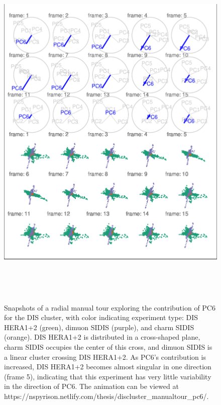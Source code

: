 \begin{Schunk}
\begin{figure}

{\centering \includegraphics[width=5.83in,height=7in]{spinifex_paper_files/figure-latex/DISclusterGood-1} 

}

\caption[Snapshots of a radial manual tour exploring the contribution of PC6 for the DIS cluster, with color indicating experiment type]{Snapshots of a radial manual tour exploring the contribution of PC6 for the DIS cluster, with color indicating experiment type: DIS HERA1+2 (green), dimuon SIDIS (purple), and charm SIDIS (orange). DIS HERA1+2 is distributed in a cross-shaped plane, charm SIDIS occupies the center of this cross, and dimuon SIDIS is a linear cluster crossing DIS HERA1+2. As PC6's contribution is increased, DIS HERA1+2 becomes almost singular in one direction (frame 5), indicating that this experiment has very little variability in the direction of PC6.  The animation can be viewed at https://nspyrison.netlify.com/thesis/discluster\_manualtour\_pc6/.}\label{fig:DISclusterGood}
\end{figure}
\end{Schunk}

